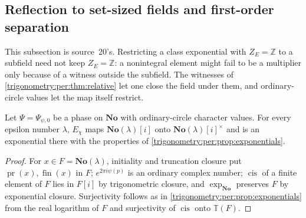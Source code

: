 \documentclass[11pt,letterpaper]{article}
\numberwithin{equation}{section}
\theoremstyle{definition}
\theoremstyle{remark}
\newcommand{\No}{\mathbf{No}}
\newcommand{\Z}{\mathbb Z}
\newcommand{\TT}{\mathbb T}
\newcommand{\fin}{\operatorname{fin}}
\newcommand{\cis}{\operatorname{cis}}
\newcommand{\pr}{\operatorname{pr}}
\begin{document}
\subsection{Reflection to set-sized fields and first-order separation}
\label{trigonometry:per:sec:reflection}
This subsection is source~20's. Restricting a class exponential with $Z_E=\Z$ to a subfield need not
keep $Z_E=\Z$: a nonintegral element might fail to be a multiplier only because of a witness outside
the subfield. The witnesses of \cref{trigonometry:per:thm:relative} let one close the field under
them, and ordinary-circle values let the map itself restrict.

\begin{lemma}\label{trigonometry:per:lem:restriction}
Let $\Psi=\Psi_{\psi,0}$ be a phase on $\No$ with ordinary-circle character values. For every epsilon
number $\lambda$, $E_\chi$ maps $\No(\lambda)[i]$ onto $\No(\lambda)[i]^\times$ and is an exponential
there with the properties of \cref{trigonometry:per:prop:exponentials}.
\end{lemma}
\begin{proof}
For $x\in F=\No(\lambda)$, initiality and truncation closure put $\pr(x),\fin(x)$ in $F$;
$e^{2\pi i\psi(p)}$ is an ordinary complex number; $\cis$ of a finite element of $F$ lies in $F[i]$ by
trigonometric closure, and $\exp_{\No}$ preserves $F$ by exponential closure. Surjectivity follows as
in \cref{trigonometry:per:prop:exponentials} from the real logarithm of $F$ and surjectivity of
$\cis$ onto $\TT(F)$.
\end{proof}
\end{document}
